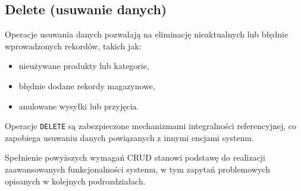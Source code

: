 \subsection*{Delete (usuwanie danych)}
Operacje usuwania danych pozwalają na eliminację nieaktualnych
lub błędnie wprowadzonych rekordów, takich jak:
\begin{itemize}
    \item nieużywane produkty lub kategorie,
    \item błędnie dodane rekordy magazynowe,
    \item anulowane wysyłki lub przyjęcia.
\end{itemize}
Operacje \texttt{DELETE} są zabezpieczone mechanizmami integralności
referencyjnej, co zapobiega usuwaniu danych powiązanych z innymi
encjami systemu.

\medskip
Spełnienie powyższych wymagań CRUD stanowi podstawę do realizacji
zaawansowanych funkcjonalności systemu, w tym zapytań problemowych
opisanych w kolejnych podrozdziałach.
